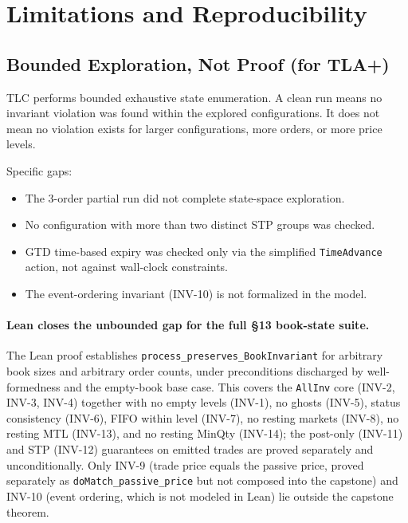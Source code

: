 \documentclass[11pt,a4paper]{article}
\begin{document}
\section{Limitations and Reproducibility}
\label{sec:limitations}

\subsection{Bounded Exploration, Not Proof (for TLA+)}

TLC performs bounded exhaustive state enumeration. A clean run means no
invariant violation was found within the explored configurations. It
does not mean no violation exists for larger configurations, more
orders, or more price levels.

Specific gaps:
\begin{itemize}[nosep]
\item The 3-order partial run did not complete state-space exploration.
\item No configuration with more than two distinct STP groups was
      checked.
\item GTD time-based expiry was checked only via the simplified
      \texttt{TimeAdvance} action, not against wall-clock constraints.
\item The event-ordering invariant (INV-10) is not formalized in the
      model.
\end{itemize}

\paragraph{Lean closes the unbounded gap for the full \S13 book-state
suite.} The Lean proof establishes
\texttt{process\_preserves\_BookInvariant} for arbitrary book sizes and
arbitrary order counts, under preconditions discharged by
well-formedness and the empty-book base case. This covers the
\texttt{AllInv} core (INV-2, INV-3, INV-4) together with no empty levels
(INV-1), no ghosts (INV-5), status consistency (INV-6), FIFO within
level (INV-7), no resting markets (INV-8), no resting MTL (INV-13), and
no resting MinQty (INV-14); the post-only (INV-11) and STP (INV-12)
guarantees on emitted trades are proved separately and unconditionally.
Only INV-9 (trade price equals the passive price, proved separately as
\texttt{doMatch\_passive\_price} but not composed into the capstone)
and INV-10 (event ordering, which is not modeled in Lean) lie outside
the capstone theorem.
\end{document}
